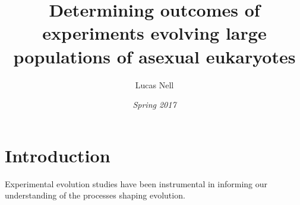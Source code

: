                           
\iffalse
cd ./_paper
xelatex paper && biber paper && xelatex paper
rm *.log *.bcf *.aux *.bbl *.blg *.run.xml
\fi





\title{\vspace*{-3ex}Determining outcomes of experiments evolving large populations of
asexual eukaryotes}
\author{Lucas Nell}
\date{\vspace*{-3ex}\emph{Spring 2017}}




\maketitle

\raggedright

\section{Introduction}


Experimental evolution studies have been instrumental in informing our understanding
of the processes shaping evolution. 








\cite{Jerison:2015kw}

\cite{Voordeckers:2015cl}
\cite{Schlotterer:2014jza}

\cite{Elena:2003fr}
\cite{TollRiera:2016fd}

\cite{Gompert:2016eg}


\cite{Chandler:2014bn}


\cite{Gerstein:2012ki}

